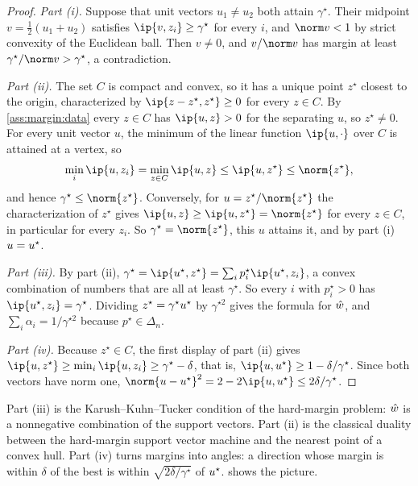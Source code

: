 \begin{refsection}
\begin{proof}
\emph{Part (i).} Suppose that unit vectors $u_1\ne u_2$ both attain $\gamma^\star$. Their midpoint $v=\frac12(u_1+u_2)$ satisfies $\ip{v,z_i}\ge\gamma^\star$ for every $i$, and $\norm v<1$ by strict convexity of the Euclidean ball. Then $v\ne0$, and $v/\norm v$ has margin at least $\gamma^\star/\norm v>\gamma^\star$, a contradiction.

\emph{Part (ii).} The set $C$ is compact and convex, so it has a unique point $z^\star$ closest to the origin, characterized by $\ip{z-z^\star,z^\star}\ge0$ for every $z\in C$. By \cref{ass:margin:data} every $z\in C$ has $\ip{u,z}>0$ for the separating $u$, so $z^\star\ne0$. For every unit vector $u$, the minimum of the linear function $\ip{u,\cdot}$ over $C$ is attained at a vertex, so
\[
  \min_i\ip{u,z_i}=\min_{z\in C}\ip{u,z}\le\ip{u,z^\star}\le\norm{z^\star},
\]
and hence $\gamma^\star\le\norm{z^\star}$. Conversely, for $u=z^\star/\norm{z^\star}$ the characterization of $z^\star$ gives $\ip{u,z}\ge\ip{u,z^\star}=\norm{z^\star}$ for every $z\in C$, in particular for every $z_i$. So $\gamma^\star=\norm{z^\star}$, this $u$ attains it, and by part (i) $u=u^\star$.

\emph{Part (iii).} By part (ii), $\gamma^\star=\ip{\marginu,z^\star}=\sum_ip^\star_i\ip{\marginu,z_i}$, a convex combination of numbers that are all at least $\gamma^\star$. So every $i$ with $p^\star_i>0$ has $\ip{\marginu,z_i}=\gamma^\star$. Dividing $z^\star=\gamma^\star u^\star$ by $\gamma^{\star2}$ gives the formula for $\hat w$, and $\sum_i\alpha_i=1/\gamma^{\star2}$ because $p^\star\in\Delta_n$.

\emph{Part (iv).} Because $z^\star\in C$, the first display of part (ii) gives $\ip{u,z^\star}\ge\min_i\ip{u,z_i}\ge\gamma^\star-\delta$, that is, $\ip{u,\marginu}\ge1-\delta/\gamma^\star$. Since both vectors have norm one, $\norm{u-\marginu}^2=2-2\ip{u,\marginu}\le2\delta/\gamma^\star$.
\end{proof}

Part (iii) is the Karush--Kuhn--Tucker condition of the hard-margin problem: $\hat w$ is a nonnegative combination of the support vectors. Part (ii) is the classical duality between the hard-margin support vector machine and the nearest point of a convex hull. Part (iv) turns margins into angles: a direction whose margin is within $\delta$ of the best is within $\sqrt{2\delta/\gamma^\star}$ of $u^\star$.  shows the picture.


\end{refsection}
